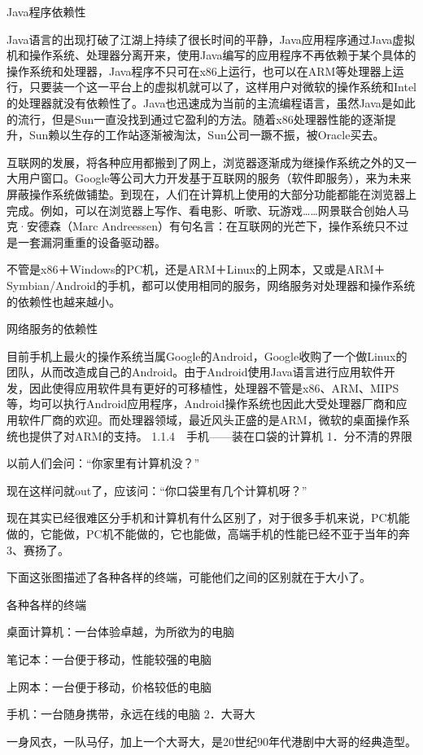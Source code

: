 \documentclass[12pt,UTF8]{ctexbook}
\begin{document}
Java程序依赖性

Java语言的出现打破了江湖上持续了很长时间的平静，Java应用程序通过Java虚拟机和操作系统、处理器分离开来，使用Java编写的应用程序不再依赖于某个具体的操作系统和处理器，Java程序不只可在x86上运行，也可以在ARM等处理器上运行，只要装一个这一平台上的虚拟机就可以了，这样用户对微软的操作系统和Intel的处理器就没有依赖性了。Java也迅速成为当前的主流编程语言，虽然Java是如此的流行，但是Sun一直没找到通过它盈利的方法。随着x86处理器性能的逐渐提升，Sun赖以生存的工作站逐渐被淘汰，Sun公司一蹶不振，被Oracle买去。

互联网的发展，将各种应用都搬到了网上，浏览器逐渐成为继操作系统之外的又一大用户窗口。Google等公司大力开发基于互联网的服务（软件即服务），来为未来屏蔽操作系统做铺垫。到现在，人们在计算机上使用的大部分功能都能在浏览器上完成。例如，可以在浏览器上写作、看电影、听歌、玩游戏……网景联合创始人马克·安德森（Marc Andreessen）有句名言：在互联网的光芒下，操作系统只不过是一套漏洞重重的设备驱动器。

不管是x86＋Windows的PC机，还是ARM＋Linux的上网本，又或是ARM＋Symbian/Android的手机，都可以使用相同的服务，网络服务对处理器和操作系统的依赖性也越来越小。

网络服务的依赖性

目前手机上最火的操作系统当属Google的Android，Google收购了一个做Linux的团队，从而改造成自己的Android。由于Android使用Java语言进行应用软件开发，因此使得应用软件具有更好的可移植性，处理器不管是x86、ARM、MIPS等，均可以执行Android应用程序，Android操作系统也因此大受处理器厂商和应用软件厂商的欢迎。而处理器领域，最近风头正盛的是ARM，微软的桌面操作系统也提供了对ARM的支持。
1.1.4　手机——装在口袋的计算机
1．分不清的界限

以前人们会问：“你家里有计算机没？”

现在这样问就out了，应该问：“你口袋里有几个计算机呀？”

现在其实已经很难区分手机和计算机有什么区别了，对于很多手机来说，PC机能做的，它能做，PC机不能做的，它也能做，高端手机的性能已经不亚于当年的奔3、赛扬了。

下面这张图描述了各种各样的终端，可能他们之间的区别就在于大小了。

各种各样的终端

桌面计算机：一台体验卓越，为所欲为的电脑

笔记本：一台便于移动，性能较强的电脑

上网本：一台便于移动，价格较低的电脑

手机：一台随身携带，永远在线的电脑
2．大哥大

一身风衣，一队马仔，加上一个大哥大，是20世纪90年代港剧中大哥的经典造型。
\end{document}
